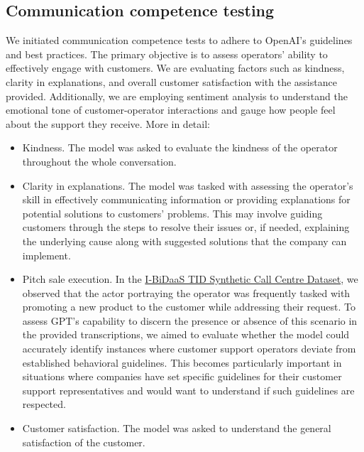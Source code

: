 \subsection{Communication competence testing}
We initiated communication competence tests to adhere to OpenAI's guidelines and best practices. The primary objective is to assess operators' ability to effectively engage with customers. We are evaluating factors such as kindness, clarity in explanations, and overall customer satisfaction with the assistance provided. Additionally, we are employing sentiment analysis to understand the emotional tone of customer-operator interactions and gauge how people feel about the support they receive. More in detail:
\begin{itemize}
      \item Kindness. The model was asked to evaluate the kindness of the operator throughout the whole conversation.
      \item Clarity in explanations. The model was tasked with assessing the operator's skill in effectively communicating information or providing explanations for potential solutions to customers' problems. This may involve guiding customers through the steps to resolve their issues or, if needed, explaining the underlying cause along with suggested solutions that the company can implement.
      \item Pitch sale execution. In the \href{https://zenodo.org/records/4274454}{I-BiDaaS TID Synthetic Call Centre Dataset}, we observed that the actor portraying the operator was frequently tasked with promoting a new product to the customer while addressing their request. To assess GPT's capability to discern the presence or absence of this scenario in the provided transcriptions, we aimed to evaluate whether the model could accurately identify instances where customer support operators deviate from established behavioral guidelines. This becomes particularly important in situations where companies have set specific guidelines for their customer support representatives and would want to understand if such guidelines are respected.
      \item Customer satisfaction. The model was asked to understand the general satisfaction of the customer.
\end{itemize}

